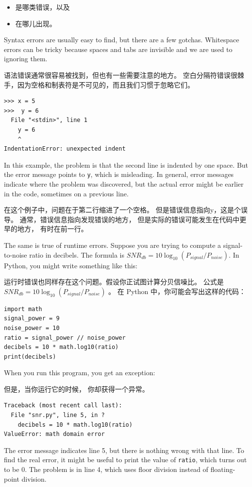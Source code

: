 {{{{\begin{itemize}
\item 是哪类错误，以及

\item 在哪儿出现。

\end{itemize}

Syntax errors are usually easy to find, but there are a few
gotchas.  Whitespace errors can be tricky because spaces and
tabs are invisible and we are used to ignoring them.

语法错误通常很容易被找到，但也有一些需要注意的地方。
空白分隔符错误很棘手，因为空格和制表符是不可见的，而且我们习惯于忽略它们。

\begin{lstlisting}
>>> x = 5
>>>  y = 6
  File "<stdin>", line 1
    y = 6
    ^
IndentationError: unexpected indent
\end{lstlisting}

%
In this example, the problem is that the second line is indented by
one space.  But the error message points to {\tt y}, which is
misleading.  In general, error messages indicate where the problem was
discovered, but the actual error might be earlier in the code,
sometimes on a previous line.

在这个例子中，问题在于第二行缩进了一个空格。
但是错误信息指向y，这是个误导。 通常，错误信息指向发现错误的地方，
但是实际的错误可能发生在代码中更早的地方， 有时在前一行。
  

The same is true of runtime errors.  Suppose you are trying
to compute a signal-to-noise ratio in decibels.  The formula
is $SNR_{db} = 10 \log_{10} (P_{signal} / P_{noise})$.  In Python,
you might write something like this:

运行时错误也同样存在这个问题。假设你正试图计算分贝信噪比。
公式是 $SNR_{db} = 10 \log_{10} (P_{signal} / P_{noise})$ 。
在 Python 中，你可能会写出这样的代码：

\begin{lstlisting}
import math
signal_power = 9
noise_power = 10
ratio = signal_power // noise_power
decibels = 10 * math.log10(ratio)
print(decibels)
\end{lstlisting}
%
When you run this program, you get an exception:

但是，当你运行它的时候， 你却获得一个异常。

%
  

\begin{lstlisting}
Traceback (most recent call last):
  File "snr.py", line 5, in ?
    decibels = 10 * math.log10(ratio)
ValueError: math domain error
\end{lstlisting}
%
The error message indicates line 5, but there is nothing
wrong with that line.  To find the real error, it might be
useful to print the value of {\tt ratio}, which turns out to
be 0.  The problem is in line 4, which uses floor division
instead of floating-point division.

}}}}
